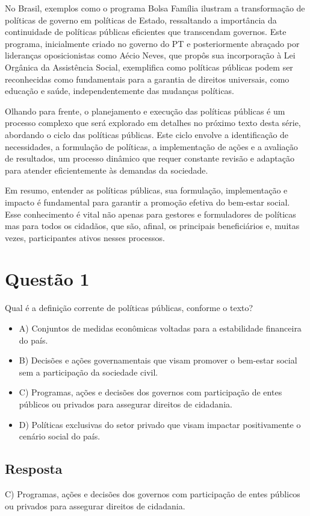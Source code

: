\documentclass[
   article,       
   12pt,          
   oneside,       
   a4paper,       
   english,       
   brazil,        
   sumario=tradicional
   ]{abntex2}
\begin{document}
No Brasil, exemplos como o programa Bolsa Família ilustram a transformação de políticas de governo em políticas de Estado, ressaltando a importância da continuidade de políticas públicas eficientes que transcendam governos. Este programa, inicialmente criado no governo do PT e posteriormente abraçado por lideranças oposicionistas como Aécio Neves, que propôs sua incorporação à Lei Orgânica da Assistência Social, exemplifica como políticas públicas podem ser reconhecidas como fundamentais para a garantia de direitos universais, como educação e saúde, independentemente das mudanças políticas.

Olhando para frente, o planejamento e execução das políticas públicas é um processo complexo que será explorado em detalhes no próximo texto desta série, abordando o ciclo das políticas públicas. Este ciclo envolve a identificação de necessidades, a formulação de políticas, a implementação de ações e a avaliação de resultados, um processo dinâmico que requer constante revisão e adaptação para atender eficientemente às demandas da sociedade.

Em resumo, entender as políticas públicas, sua formulação, implementação e impacto é fundamental para garantir a promoção efetiva do bem-estar social. Esse conhecimento é vital não apenas para gestores e formuladores de políticas mas para todos os cidadãos, que são, afinal, os principais beneficiários e, muitas vezes, participantes ativos nesses processos.
\section{Questão 1}
Qual é a definição corrente de políticas públicas, conforme o texto?
\begin{itemize}
    \item {A) Conjuntos de medidas econômicas voltadas para a estabilidade financeira do país.}
    \item {B) Decisões e ações governamentais que visam promover o bem-estar social sem a participação da sociedade civil.}
    \item {C) Programas, ações e decisões dos governos com participação de entes públicos ou privados para assegurar direitos de cidadania.}
    \item {D) Políticas exclusivas do setor privado que visam impactar positivamente o cenário social do país.}
\end{itemize}

\subsection{Resposta}
C) Programas, ações e decisões dos governos com participação de entes públicos ou privados para assegurar direitos de cidadania.
\end{document}
